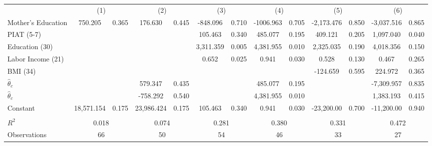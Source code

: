\begin{tabular}{lcccccccccccc} \toprule
 & \multicolumn{2}{c}{(1)}  &  \multicolumn{2}{c}{(2)}  &  \multicolumn{2}{c}{(3)}  &  \multicolumn{2}{c}{(4)}  & \multicolumn{2}{c}{(5)} & \multicolumn{2}{c}{(6)} \\  
Mother's Education &   750.205 &     0.365 &   176.630 &     0.445 &  -848.096 &     0.710 & -1006.963 &     0.705 & -2,173.476 &     0.850 & -3,037.516 &     0.865 \\  
PIAT (5-7) &         &         &         &         &   105.463 &     0.340 &   485.077 &     0.195 &   409.121 &     0.205 &  1,097.040 &     0.040 \\  
Education (30)  &         &         &         &         &  3,311.359 &     0.005 &  4,381.955 &     0.010 &  2,325.035 &     0.190 &  4,018.356 &     0.150 \\  
Labor Income (21) &         &         &         &         &     0.652 &     0.025 &     0.941 &     0.030 &     0.528 &     0.130 &     0.467 &     0.265 \\  
BMI (34) &         &         &         &         &         &         &         &         &  -124.659 &     0.595 &   224.972 &     0.365 \\  
$\hat{\theta}_{c}$ &         &         &   579.347 &     0.435 &         &         &   485.077 &     0.195 &         &         & -7,309.957 &     0.835 \\  
$\hat{\theta}_{c}$ &         &         &  -758.292 &     0.540 &         &         &  4,381.955 &     0.010 &         &         &  1,383.193 &     0.415 \\  
Constant & 18,571.154 &     0.175 & 23,986.424 &     0.175 &   105.463 &     0.340 &     0.941 &     0.030 & -23,200.00 &     0.700 & -11,200.00 &     0.940 \\ \\ \midrule  
$R^2$ &      \multicolumn{2}{c}{0.018} & \multicolumn{2}{c}{0.074}      &     \multicolumn{2}{c}{0.281} &        \multicolumn{2}{c}{0.380} &  \multicolumn{2}{c}{0.331} &          \multicolumn{2}{c}{0.472}       \\ 
Observations &    \multicolumn{2}{c}{66} &         \multicolumn{2}{c}{50} &        \multicolumn{2}{c}{54}&         \multicolumn{2}{c}{46} &      \multicolumn{2}{c}{33} &        \multicolumn{2}{c}{27}     \\  
\bottomrule \end{tabular}